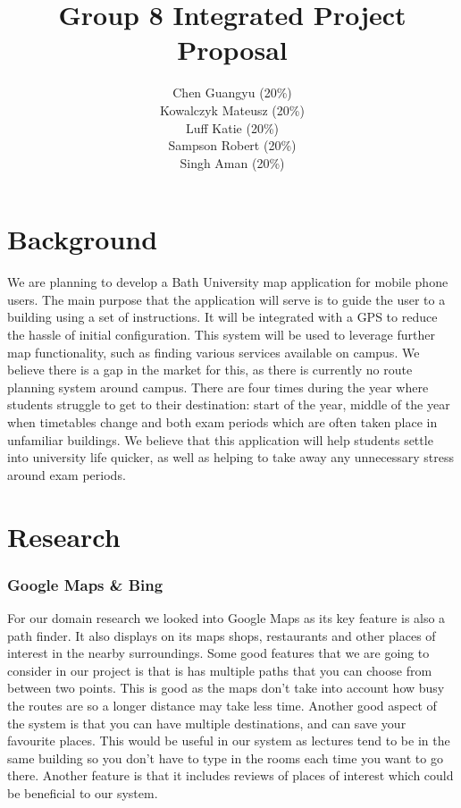 \documentclass[10pt,a4paper,oneside]{report}
\begin{document}
\title{Group 8 Integrated Project Proposal}

\author{
  Chen Guangyu (20\%)\\
  Kowalczyk Mateusz (20\%)\\
  Luff Katie (20\%)\\
  Sampson Robert (20\%)\\
  Singh Aman (20\%)\\ }
\maketitle
\section*{Background}
We are planning to develop a Bath University map application for mobile phone users. The main purpose that the application will serve is to guide the user to a building using a set of instructions. It will be integrated with a GPS to reduce the hassle of initial configuration. This system will be used to leverage further map functionality, such as finding various services available on campus.
We believe there is a gap in the market for this, as there is currently no route planning system around campus. There are four times during the year where students struggle to get to their destination: start of the year, middle of the year when timetables change and both exam periods which are often taken place in unfamiliar buildings. We believe that this application will help students settle into university life quicker, as well as helping to take away any unnecessary stress around exam periods.

\section*{Research}
\subsubsection*{Google Maps \& Bing}
For our domain research we looked into Google Maps as its key feature is also a path finder. It also displays on its maps shops, restaurants and other places of interest in the nearby surroundings. Some good features that we are going to consider in our project is that is has multiple paths that you can choose from between two points. This is good as the maps don't take into account how busy the routes are so a longer distance may take less time. Another good aspect of the system is that you can have multiple destinations, and can save your favourite places. This would be useful in our system as lectures tend to be in the same building so you don't have to type in the rooms each time you want to go there. Another feature is that it includes reviews of places of interest which could be beneficial to our system.
\end{document}
